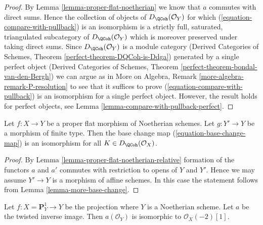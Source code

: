 \begin{proof}
By Lemma \ref{lemma-proper-flat-noetherian} we know that $a$ commutes
with direct sums. Hence the collection of objects of
$D_\QCoh(\mathcal{O}_Y)$ for which (\ref{equation-compare-with-pullback})
is an isomorphism is a strictly full, saturated, triangulated
subcategory of $D_\QCoh(\mathcal{O}_Y)$ which is moreover
preserved under taking direct sums. Since $D_\QCoh(\mathcal{O}_Y)$
is a module category (Derived Categories of Schemes, Theorem
\ref{perfect-theorem-DQCoh-is-Ddga}) generated by a single
perfect object (Derived Categories of Schemes, Theorem
\ref{perfect-theorem-bondal-van-den-Bergh})
we can argue as in
More on Algebra, Remark \ref{more-algebra-remark-P-resolution}
to see that it suffices to prove (\ref{equation-compare-with-pullback})
is an isomorphism for a single perfect object.
However, the result holds for perfect objects, see
Lemma \ref{lemma-compare-with-pullback-perfect}.
\end{proof}

\begin{lemma}
\label{lemma-proper-flat-base-change}
Let $f : X \to Y$ be a proper flat morphism of Noetherian schemes.
Let $g : Y' \to Y$ be a morphism of finite type. Then the base
change map (\ref{equation-base-change-map}) is an isomorphism
for all $K \in D_\QCoh(\mathcal{O}_X)$.
\end{lemma}

\begin{proof}
By Lemma \ref{lemma-proper-flat-noetherian-relative} formation of the
functors $a$ and $a'$ commutes with restriction to opens of $Y$ and $Y'$.
Hence we may assume $Y' \to Y$ is a morphism of affine schemes. In this
case the statement follows from Lemma \ref{lemma-more-base-change}.
\end{proof}

\begin{lemma}
\label{lemma-upper-shriek-P1}
Let $f : X = \mathbf{P}^1_Y \to Y$ be the projection where $Y$ is
a Noetherian scheme. Let $a$ be the twisted inverse image.
Then $a(\mathcal{O}_Y)$ is isomorphic to $\mathcal{O}_X(-2)[1]$.
\end{lemma}

